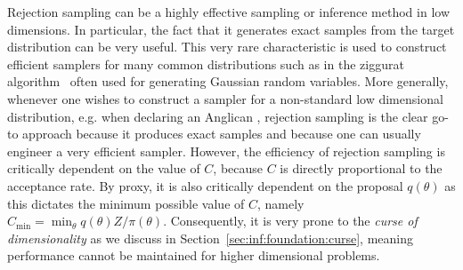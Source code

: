 Rejection sampling can be a highly effective sampling or inference method in low dimensions.
In particular, the fact that it generates exact samples from the target distribution can be very
useful.  This very rare characteristic is used to construct efficient samplers for many 
common distributions such as in the ziggurat algorithm~\citep{marsaglia2000ziggurat} often
used for generating Gaussian random variables.  More generally, whenever one wishes to construct
a sampler for a non-standard low dimensional distribution, e.g. when declaring an Anglican ,
rejection sampling is the clear go-to approach because it produces exact samples and because
one can usually engineer a very efficient sampler.
However, the efficiency of rejection sampling is critically dependent
on the value of $C$, because $C$ is directly proportional to the acceptance rate.  By proxy, it
is also critically dependent on the proposal $q(\theta)$ as this dictates the minimum possible
value of $C$, namely $C_{\min} = \min_{\theta} q(\theta) Z / \pi(\theta)$.  
 Consequently, it is very prone to the \emph{curse of dimensionality} as
we discuss in Section~\ref{sec:inf:foundation:curse}, meaning performance cannot be
maintained for higher dimensional problems.